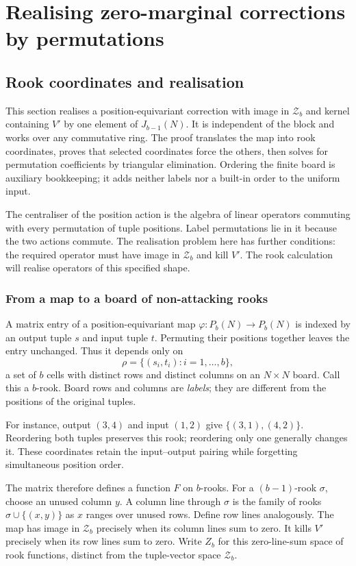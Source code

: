 \section{Realising zero-marginal corrections by permutations}\label{sec:rook-realization}
\subsection{Rook coordinates and realisation}\label{sec:rooks}
This section realises a position-equivariant correction with image in $\mathcal Z_b$ and kernel containing $V'$ by one element of $J_{b-1}(N)$. It is independent of the block and works over any commutative ring. The proof translates the map into rook coordinates, proves that selected coordinates force the others, then solves for permutation coefficients by triangular elimination. Ordering the finite board is auxiliary bookkeeping; it adds neither labels nor a built-in order to the uniform input.

The centraliser of the position action is the algebra of linear
operators commuting with every permutation of tuple positions.
Label permutations lie in it because the two actions commute.
The realisation problem here has further conditions: the required
operator must have image in $\mathcal Z_b$ and kill $V'$.
The rook calculation will realise operators of this specified shape.

\subsubsection{From a map to a board of non-attacking rooks}
A matrix entry of a position-equivariant map $\varphi:P_b(N)\to P_b(N)$ is indexed by an output tuple $s$ and input tuple $t$. Permuting their positions together leaves the entry unchanged. Thus it depends only on
\[\rho=\{(s_i,t_i):i=1,\ldots,b\},
\]
a set of $b$ cells with distinct rows and distinct columns on an $N\times N$ board. Call this a $b$-rook. Board rows and columns are \emph{labels}; they are different from the positions of the original tuples.

For instance, output $(3,4)$ and input $(1,2)$ give
$\{(3,1),(4,2)\}$. Reordering both tuples preserves this rook;
reordering only one generally changes it. These coordinates retain
the input--output pairing while forgetting simultaneous position order.

The matrix therefore defines a function $F$ on $b$-rooks. For a $(b-1)$-rook $\sigma$, choose an unused column $y$. A column line through $\sigma$ is the family of rooks $\sigma\cup\{(x,y)\}$ as $x$ ranges over unused rows. Define row lines analogously. The map has image in $\mathcal Z_b$ precisely when its column lines sum to zero. It kills $V'$ precisely when its row lines sum to zero. Write $Z_b$ for this zero-line-sum space of rook functions, distinct from the tuple-vector space $\mathcal Z_b$.

